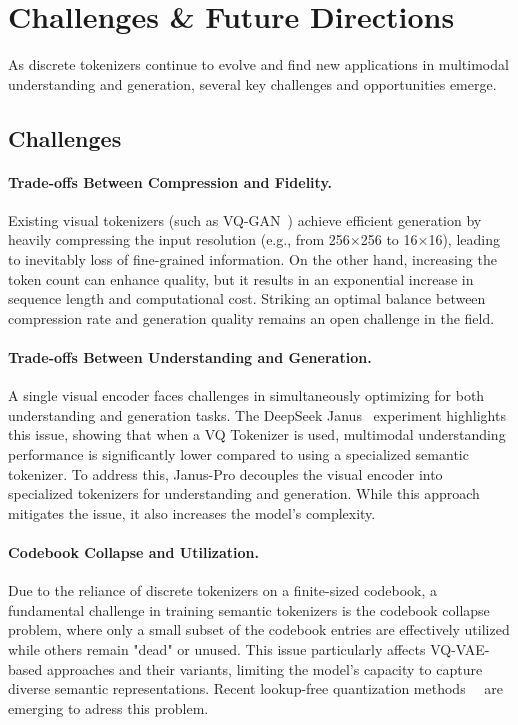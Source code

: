 \section{Challenges \& Future Directions} \label{sec:challenge}

As discrete tokenizers continue to evolve and find new applications in multimodal understanding and generation, several key challenges and opportunities emerge. 


\subsection{Challenges}

\paragraph{Trade-offs Between Compression and Fidelity.}
Existing visual tokenizers (such as VQ-GAN~\cite{esser2021vqgan}) achieve efficient generation by heavily compressing the input resolution (e.g., from 256$\times$256 to 16$\times$16), leading to inevitably loss of fine-grained information. 
On the other hand, increasing the token count can enhance quality, but it results in an exponential increase in sequence length and computational cost.
Striking an optimal balance between compression rate and generation quality remains an open challenge in the field.

\paragraph{Trade-offs Between Understanding and Generation.}
A single visual encoder faces challenges in simultaneously optimizing for both understanding and generation tasks. 
The DeepSeek Janus~\cite{chen2025janus} experiment highlights this issue, showing that when a VQ Tokenizer is used, multimodal understanding performance is significantly lower compared to using a specialized semantic tokenizer. 
To address this, Janus-Pro decouples the visual encoder into specialized tokenizers for understanding and generation. While this approach mitigates the issue, it also increases the model's complexity.


\paragraph{Codebook Collapse and Utilization.} Due to the reliance of discrete tokenizers on a finite-sized codebook, a fundamental challenge in training semantic tokenizers is the codebook collapse problem, where only a small subset of the codebook entries are effectively utilized while others remain "dead" or unused. 
This issue particularly affects VQ-VAE-based approaches and their variants, limiting the model's capacity to capture diverse semantic representations.
Recent lookup-free quantization methods~\cite{mentzer2023fsq}~\cite{yu2023magvit-v2} are emerging to adress this problem.

